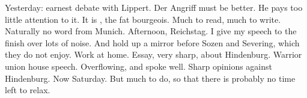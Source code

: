 Yesterday: earnest debate with Lippert. Der Angriff must be better. He pays too little attention to it. It is , the fat bourgeois.  Much to read, much to write. Naturally no word from Munich. Afternoon, Reichstag. I give my speech to the finish over lots of noise. And hold up a mirror before Sozen and Severing, which they do not enjoy. Work at home. Essay, very sharp, about Hindenburg. Warrior union house speech. Overflowing, and spoke well. Sharp opinions against Hindenburg. Now Saturday. But much to do, so that there is probably no time left to relax.